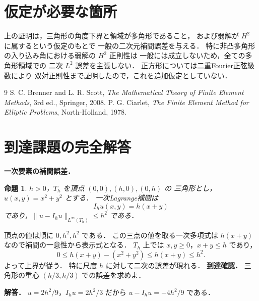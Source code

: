 \documentclass[a5paper,10pt,onecolumn]{jsarticle}
\makeatletter
\theoremstyle{mathnotetheorem}
\newtheorem{proposition}[theorem]{命題}
\renewcommand{\proofname}{証明}
\renewenvironment{proof}[1][\proofname]{%
  \par\pushQED{\qed}\normalfont\topsep4\p@\@plus2\p@\relax
  \trivlist\item[\hskip\labelsep\bfseries #1]\ignorespaces
}{\popQED\endtrivlist\@endpefalse}
\makeatother
\begin{document}
\section{仮定が必要な箇所}
上の証明は，三角形の角度下界と領域が多角形であること，
および弱解が $H^2$ に属するという仮定のもとで
一般の二次元補間誤差を与える．
特に非凸多角形の入り込み角における弱解の $H^2$ 正則性は
一般には成立しないため，全ての多角形領域での
二次 $L^2$ 誤差を主張しない．
正方形については二重Fourier正弦級数により
双対正則性まで証明したので，これを追加仮定としていない．

\begin{thebibliography}{9}
 S. C. Brenner and L. R. Scott,
 \emph{The Mathematical Theory of Finite Element Methods},
 3rd ed., Springer, 2008.
 P. G. Ciarlet,
 \emph{The Finite Element Method for Elliptic Problems},
 North-Holland, 1978.
\end{thebibliography}

\section{到達課題の完全解答}
\noindent\textbf{一次要素の補間誤差．}
\begin{proposition}
$h>0$，$T_h$ を頂点 $(0,0),(h,0),(0,h)$ の
三角形とし，$u(x,y)=x^2+y^2$ とする．
一次Lagrange補間は
\[
I_hu(x,y)=h(x+y)
\]
であり，$\|u-I_hu\|_{L^\infty(T_h)}\le h^2$ である．
\end{proposition}
\begin{proof}
頂点の値は順に $0,h^2,h^2$ である．
この三点の値を取る一次多項式は
$h(x+y)$ なので補間の一意性から表示式となる．
$T_h$ 上では $x,y\ge0$，$x+y\le h$ であり，
\[
0\le h(x+y)-(x^2+y^2)
\le h(x+y)\le h^2.
\]
よって上界が従う．
特に尺度 $h$ に対して二次の誤差が現れる．
\end{proof}
\noindent\textbf{到達確認．}
三角形の重心 $(h/3,h/3)$ での誤差を求めよ．
\par\noindent\textbf{解答．}
$u=2h^2/9$，$I_hu=2h^2/3$ だから
$u-I_hu=-4h^2/9$ である．
\end{document}

